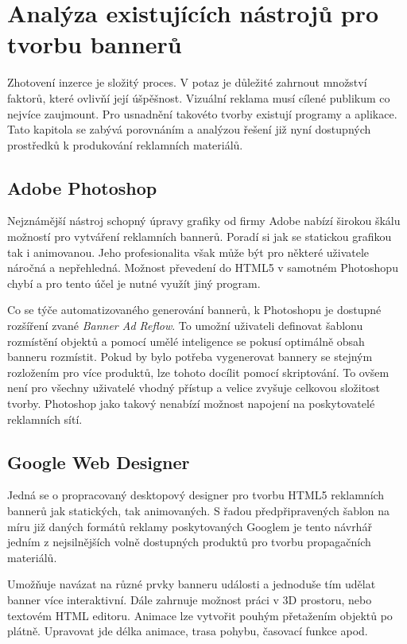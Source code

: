 \chapter{Analýza existujících nástrojů pro tvorbu bannerů}
\label{chap:analysis}
Zhotovení inzerce je složitý proces. V potaz je důležité zahrnout množství faktorů, které ovlivňí její úšpěšnost. Vizuální reklama musí cílené publikum co nejvíce zaujmount.
Pro usnadnění takovéto tvorby existují programy a aplikace. Tato kapitola se zabývá porovnáním a analýzou řešení již nyní dostupných prostředků k produkování reklamních materiálů.

\section{Adobe Photoshop}
Nejznámější nástroj schopný úpravy grafiky od firmy Adobe nabízí širokou škálu možností pro vytváření reklamních bannerů.
Poradí si jak se statickou grafikou tak i animovanou. Jeho profesionalita však může být pro některé uživatele náročná a nepřehledná.
Možnost převedení do HTML5 v samotném Photoshopu chybí a pro tento účel je nutné využít jiný program.

Co se týče automatizovaného generování bannerů, k Photoshopu je dostupné rozšíření zvané \emph{Banner Ad Reflow}.
To umožní uživateli definovat šablonu rozmístění objektů a pomocí umělé inteligence se pokusí optimálně obsah banneru rozmístit.
Pokud by bylo potřeba vygenerovat bannery se stejným rozložením pro více produktů, lze tohoto docílit pomocí skriptování.
To ovšem není pro všechny uživatelé vhodný přístup a velice zvyšuje celkovou složitost tvorby. Photoshop jako takový nenabízí možnost napojení na poskytovatelé reklamních sítí.

\section{Google Web Designer}
Jedná se o propracovaný desktopový designer pro tvorbu HTML5 reklamních bannerů jak statických, tak animovaných.
S řadou předpřipravených šablon na míru již daných formátů reklamy poskytovaných Googlem je tento návrhář jedním z nejsilnějších
volně dostupných produktů pro tvorbu propagačních materiálů.

Umožňuje navázat na různé prvky banneru události a jednoduše tím udělat banner více interaktivní.
Dále zahrnuje možnost práci v 3D prostoru, nebo textovém HTML editoru.
Animace lze vytvořit pouhým přetažením objektů po plátně. Upravovat jde délka animace, trasa pohybu, časovací funkce apod. 

